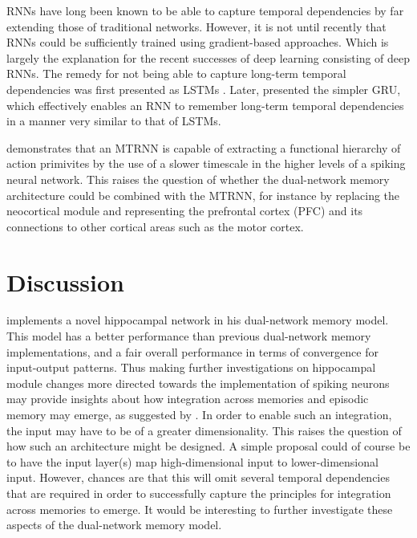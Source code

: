 
RNNs have long been known to be able to capture temporal dependencies by far extending those of traditional networks. However, it is not until recently that RNNs could be sufficiently trained using gradient-based approaches. Which is largely the explanation for the recent successes of deep learning consisting of deep RNNs. The remedy for not being able to capture long-term temporal dependencies was first presented as LSTMs \citep{Hochreiter1997}. Later, \cite{Cho2014} presented the simpler GRU, which effectively enables an RNN to remember long-term temporal dependencies in a manner very similar to that of LSTMs.



\cite{Tani2014} demonstrates that an MTRNN is capable of extracting a functional hierarchy of action primivites by the use of a slower timescale in the higher levels of a spiking neural network. This raises the question of whether the dual-network memory architecture could be combined with the MTRNN, for instance by replacing the neocortical module and representing the prefrontal cortex (PFC) and its connections to other cortical areas such as the motor cortex.


\section{Discussion}\label{discussion}

\cite{Hattori2014} implements a novel hippocampal network in his dual-network memory model. This model has a better performance than previous dual-network memory implementations, and a fair overall performance in terms of convergence for input-output patterns. Thus making further investigations on hippocampal module changes more directed towards the implementation of spiking neurons may provide insights about how integration across memories and episodic memory may emerge, as suggested by \cite{Hattori2014}. In order to enable such an integration, the input may have to be of a greater dimensionality. This raises the question of how such an architecture might be designed. A simple proposal could of course be to have the input layer(s) map high-dimensional input to lower-dimensional input. However, chances are that this will omit several temporal dependencies that are required in order to successfully capture the principles for integration across memories to emerge. It would be interesting to further investigate these aspects of the dual-network memory model.

